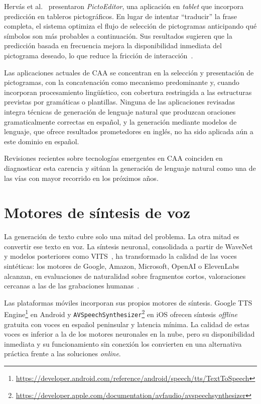 Hervás et al.~\cite{hervas2020predictivecomposition} presentaron \textit{PictoEditor}, una aplicación en \textit{tablet} que incorpora predicción en tableros pictográficos. En lugar de intentar ``traducir'' la frase completa, el sistema optimiza el flujo de selección de pictogramas anticipando qué símbolos son más probables a continuación. Sus resultados sugieren que la predicción basada en frecuencia mejora la disponibilidad inmediata del pictograma deseado, lo que reduce la fricción de interacción~\cite{curtis2022stateofart}.

Las aplicaciones actuales de CAA se concentran en la selección y presentación de pictogramas, con la concatenación como mecanismo predominante y, cuando incorporan procesamiento lingüístico, con cobertura restringida a las estructuras previstas por gramáticas o plantillas. Ninguna de las aplicaciones revisadas integra técnicas de generación de lenguaje natural que produzcan oraciones gramaticalmente correctas en español, y la generación mediante modelos de lenguaje, que ofrece resultados prometedores en inglés, no ha sido aplicada aún a este dominio en español.

Revisiones recientes sobre tecnologías emergentes en CAA coinciden en diagnosticar esta carencia y sitúan la generación de lenguaje natural como una de las vías con mayor recorrido en los próximos años.

\section{Motores de síntesis de voz}

La generación de texto cubre solo una mitad del problema. La otra mitad es convertir ese texto en voz. La síntesis neuronal, consolidada a partir de WaveNet~\cite{wavenet2016} y modelos posteriores como VITS~\cite{kim2021vits}, ha transformado la calidad de las voces sintéticas: los motores de Google, Amazon, Microsoft, OpenAI o ElevenLabs alcanzan, en evaluaciones de naturalidad sobre fragmentos cortos, valoraciones cercanas a las de las grabaciones humanas~\cite{xu2025speakease}.

Las plataformas móviles incorporan sus propios motores de síntesis. Google TTS Engine\footnote{\url{https://developer.android.com/reference/android/speech/tts/TextToSpeech}} en Android y \texttt{AVSpeechSynthesizer}\footnote{\url{https://developer.apple.com/documentation/avfaudio/avspeechsynthesizer}} en iOS ofrecen síntesis \textit{offline} gratuita con voces en español peninsular y latencia mínima. La calidad de estas voces es inferior a la de los motores neuronales en la nube, pero su disponibilidad inmediata y su funcionamiento sin conexión los convierten en una alternativa práctica frente a las soluciones \textit{online}.

